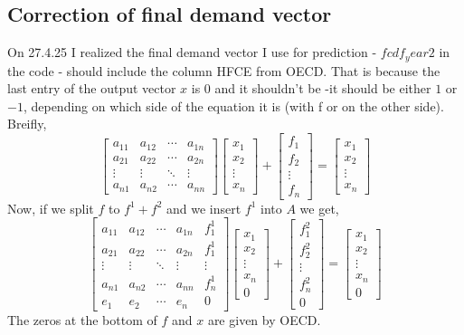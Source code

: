 \documentclass[12pt]{article}
\begin{document}
\subsection{ Correction of final demand vector}
On 27.4.25 I realized the final demand vector I use for prediction - $fcdf_year2$ in the code - should include the column HFCE from OECD.
That is because the last entry of the output vector $x$ is $0$ and it shouldn't be -it should be either $1$ or $-1$, depending on which side of the equation it is (with f or on the other side).
Breifly,
\[
\begin{bmatrix}
a_{11} & a_{12} & \cdots & a_{1n} \\
a_{21} & a_{22} & \cdots & a_{2n} \\
\vdots & \vdots & \ddots & \vdots \\
a_{n1} & a_{n2} & \cdots & a_{nn}
\end{bmatrix}
\begin{bmatrix}
x_1 \\ x_2 \\ \vdots \\ x_n
\end{bmatrix}
+
\begin{bmatrix}
f_1 \\ f_2 \\ \vdots \\ f_n
\end{bmatrix}
=
\begin{bmatrix}
x_1 \\ x_2 \\ \vdots \\ x_n
\end{bmatrix}
\]
Now, if we split $f$ to $f^1+f^2$ and we insert $f^1$ into $A$ we get, 
\[
\begin{bmatrix}
a_{11} & a_{12} & \cdots & a_{1n} & f^{1}_{1} \\
a_{21} & a_{22} & \cdots & a_{2n} & f^{1}_{1}\\
\vdots & \vdots & \ddots & \vdots  & \vdots        \\
a_{n1} & a_{n2} & \cdots & a_{nn} & f^{1}_{n} \\
e_1      & e_2      & \cdots & e_n     & 0
\end{bmatrix}
\begin{bmatrix}
x_1 \\ x_2 \\ \vdots \\ x_n \\ 0
\end{bmatrix}
+
\begin{bmatrix}
f^2_1 \\ f^2_2 \\ \vdots \\ f^2_n \\ 0
\end{bmatrix}
=
\begin{bmatrix}
x_1 \\ x_2 \\ \vdots \\ x_n \\ 0
\end{bmatrix}
\]
The zeros at the bottom of $f$ and $x$ are given by OECD.
\end{document}

